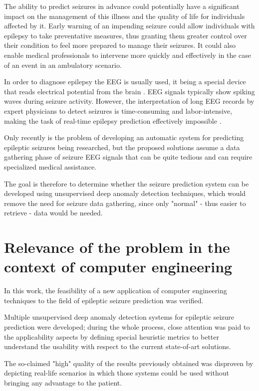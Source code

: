 The ability to predict seizures in advance could potentially have a significant impact on the management of this illness and the quality of life for individuals affected by it. Early warning of an impending seizure could allow individuals with epilepsy to take preventative measures, thus granting them greater control over their condition to feel more prepared to manage their seizures. 
It could also enable medical professionals to intervene more quickly and effectively in the case of an event in an ambulatory scenario.

In order to diagnose epilepsy the \gls{EEG} is usually used, it being a special device that reads electrical potential from the brain \cite{kumar_analysis_2012}. \gls{EEG} signals typically show spiking waves during seizure activity. However, the interpretation of long \gls{EEG} records by expert physicians to detect seizures is time-consuming and labor-intensive, making the task of real-time epilepsy prediction effectively impossible \cite{siuly_eeg_2016}.

Only recently is the problem of developing an automatic system for predicting epileptic seizures being researched, but the proposed solutions assume a data gathering phase of seizure \gls{EEG} signals that can be quite tedious and can require specialized medical assistance.

The goal is therefore to determine whether the seizure prediction system can be developed using unsupervised deep anomaly detection techniques, which would remove the need for seizure data gathering, since only "normal" - thus easier to retrieve - data would be needed.

\section{Relevance of the problem in the context of computer engineering}

In this work, the feasibility of a new application of computer engineering techniques to the field of epileptic seizure prediction was verified.

Multiple unsupervised deep anomaly detection systems for epileptic seizure prediction were developed;
during the whole process, close attention was paid to the applicability aspects by defining special heuristic metrics to better understand the usability with respect to the current state-of-art solutions.

The so-claimed "high" quality of the results previously obtained was disproven by depicting real-life scenarios in which those systems could be used without bringing any advantage to the patient.


